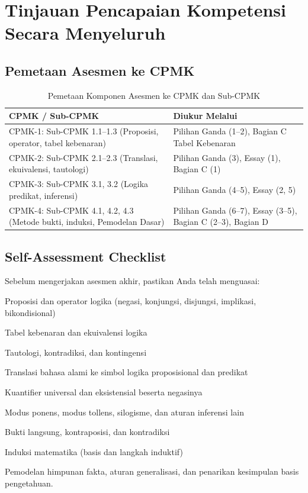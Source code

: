 \section{Tinjauan Pencapaian Kompetensi Secara Menyeluruh}

\subsection{Pemetaan Asesmen ke CPMK}

\begin{table}[htbp]
\centering
\begin{tabular}{|>{\raggedright\arraybackslash}p{5cm}|>{\raggedright\arraybackslash}p{8cm}|}
\hline
\textbf{CPMK / Sub-CPMK} & \textbf{Diukur Melalui} \\
\hline
CPMK-1: Sub-CPMK 1.1--1.3 (Proposisi, operator, tabel kebenaran) & Pilihan Ganda (1--2), Bagian C Tabel Kebenaran \\
\hline
CPMK-2: Sub-CPMK 2.1--2.3 (Translasi, ekuivalensi, tautologi) & Pilihan Ganda (3), Essay (1), Bagian C (1) \\
\hline
CPMK-3: Sub-CPMK 3.1, 3.2 (Logika predikat, inferensi) & Pilihan Ganda (4--5), Essay (2, 5) \\
\hline
CPMK-4: Sub-CPMK 4.1, 4.2, 4.3 (Metode bukti, induksi, Pemodelan Dasar) & Pilihan Ganda (6--7), Essay (3--5), Bagian C (2--3), Bagian D \\
\hline
\end{tabular}
\caption{Pemetaan Komponen Asesmen ke CPMK dan Sub-CPMK}
\end{table}

\subsection{Self-Assessment Checklist}

Sebelum mengerjakan asesmen akhir, pastikan Anda telah menguasai:

\begin{checklist}
  \item Proposisi dan operator logika (negasi, konjungsi, disjungsi, implikasi, bikondisional)
  \item Tabel kebenaran dan ekuivalensi logika
  \item Tautologi, kontradiksi, dan kontingensi
  \item Translasi bahasa alami ke simbol logika proposisional dan predikat
  \item Kuantifier universal dan eksistensial beserta negasinya
  \item Modus ponens, modus tollens, silogisme, dan aturan inferensi lain
  \item Bukti langsung, kontraposisi, dan kontradiksi
  \item Induksi matematika (basis dan langkah induktif)
  \item Pemodelan himpunan fakta, aturan generalisasi, dan penarikan kesimpulan basis pengetahuan.
\end{checklist}
